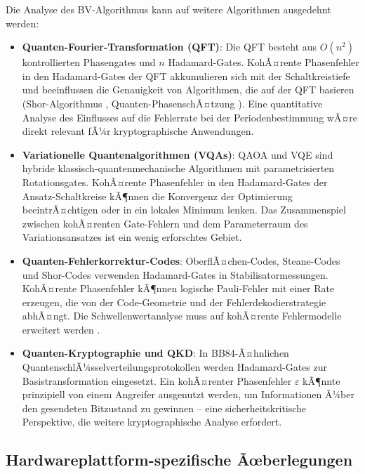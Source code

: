 ﻿\documentclass[11pt,a4paper]{article}
\theoremstyle{definition}
\newcommand{\eps}{\varepsilon}
\begin{document}
Die Analyse des BV-Algorithmus kann auf weitere Algorithmen ausgedehnt werden:

\begin{itemize}
  \item \textbf{Quanten-Fourier-Transformation (QFT)}: Die QFT besteht aus
        $O(n^2)$ kontrollierten Phasengates und $n$ Hadamard-Gates.  KohÃ¤rente
        Phasenfehler in den Hadamard-Gates der QFT akkumulieren sich mit der
        Schaltkreistiefe und beeinflussen die Genauigkeit von Algorithmen,
        die auf der QFT basieren (Shor-Algorithmus \cite{Shor1994},
        Quanten-PhasenschÃ¤tzung \cite{Kitaev1995}).  Eine quantitative Analyse
        des Einflusses auf die Fehlerrate bei der Periodenbestimmung wÃ¤re
        direkt relevant fÃ¼r kryptographische Anwendungen.

  \item \textbf{Variationelle Quantenalgorithmen (VQAs)}: QAOA \cite{Farhi2014}
        und VQE \cite{Peruzzo2014} sind hybride klassisch-quantenmechanische
        Algorithmen mit parametrisierten Rotationsgates.  KohÃ¤rente Phasenfehler
        in den Hadamard-Gates der Ansatz-Schaltkreise kÃ¶nnen die
        Konvergenz der Optimierung beeintrÃ¤chtigen oder in ein lokales
        Minimum lenken.  Das Zusammenspiel zwischen kohÃ¤renten Gate-Fehlern und
        dem Parameterraum des Variationsansatzes ist ein wenig erforschtes Gebiet.

  \item \textbf{Quanten-Fehlerkorrektur-Codes}: OberflÃ¤chen-Codes, Steane-Codes
        und Shor-Codes verwenden Hadamard-Gates in Stabilisatormessungen.
        KohÃ¤rente Phasenfehler kÃ¶nnen logische Pauli-Fehler mit einer Rate
        erzeugen, die von der Code-Geometrie und der Fehlerdekodierstrategie
        abhÃ¤ngt.  Die Schwellenwertanalyse muss auf kohÃ¤rente Fehlermodelle
        erweitert werden \cite{Gottesman2010}.

  \item \textbf{Quanten-Kryptographie und QKD}: In BB84-Ã¤hnlichen
        QuantenschlÃ¼sselverteilungsprotokollen werden Hadamard-Gates zur
        Basistransformation eingesetzt.  Ein kohÃ¤renter Phasenfehler $\eps$
        kÃ¶nnte prinzipiell von einem Angreifer ausgenutzt werden, um
        Informationen Ã¼ber den gesendeten Bitzustand zu gewinnen -- eine
        sicherheitskritische Perspektive, die weitere kryptographische Analyse erfordert.
\end{itemize}

\subsection{Hardwareplattform-spezifische Ãœberlegungen}
\label{subsec:hardware}
\end{document}
